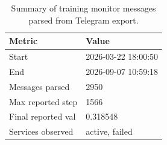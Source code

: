 \begin{table}[ht]
\centering
\begin{tabular}{ll}
\toprule
Metric & Value\\
\midrule
Start & 2026-03-22 18:00:50\\
End & 2026-09-07 10:59:18\\
Messages parsed & 2950\\
Max reported step & 1566\\
Final reported val & 0.318548\\
Services observed & active, failed\\
\bottomrule
\end{tabular}
\caption{Summary of training monitor messages parsed from Telegram export.}
\label{tab:telegram_summary}
\end{table}